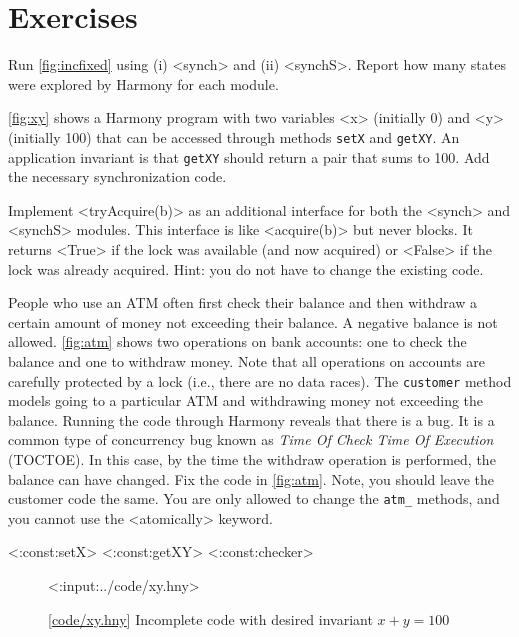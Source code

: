 \documentclass{report}
\newcommand{\harmonylink}[1]{%
[\href{https://harmony.cs.cornell.edu/#1}{\underline{#1}}]%
}
\newenvironment{code}{
\tcolorbox
}{
\endtcolorbox
}
\begin{document}
\section*{Exercises}
\begin{problems}
\item
Run \autoref{fig:incfixed} using (i) <{synch}> and (ii) <{synchS}>.
Report how many states were explored by Harmony for each module.
\item \label{ex:xy} \autoref{fig:xy} shows a Harmony program with two variables <{x}>
(initially 0) and <{y}> (initially 100) that can be accessed through methods
\texttt{setX} and \texttt{getXY}.  An application invariant is that \texttt{getXY}
should return a pair that sums to 100.  Add the necessary synchronization code.
\item \label{ex:trylock} Implement <{tryAcquire(b)}> as an additional
interface for both the <{synch}> and <{synchS}> modules.
This interface is like <{acquire(b)}> but never blocks.  It
returns <{True}> if the lock was available (and now acquired) or <{False}>
if the lock was already acquired.
Hint: you do not have to change the existing code.
\item People who use an ATM often first check their balance and then withdraw
a certain amount of money not exceeding their balance.  A negative balance
is not allowed.  \autoref{fig:atm} shows two operations on bank accounts:
one to check the balance and one to withdraw money.
Note that all operations on accounts are carefully protected by a lock
(i.e., there are no data races).
The \texttt{customer}
method models going to a particular ATM and withdrawing money not exceeding
the balance.
Running the code through Harmony reveals that there is a bug.
It is a common type of concurrency bug known as \emph{Time Of Check Time Of
Execution} (TOCTOE).
In this case, by the time the withdraw operation is performed,
the balance can have changed.
Fix the code in \autoref{fig:atm}.  Note, you should leave the
customer code the same. You are only allowed to change the
\texttt{atm\_} methods, and you cannot use the <{atomically}>
keyword.
\end{problems}

<{:const:setX}>
<{:const:getXY}>
<{:const:checker}>

\begin{figure}
\begin{code}
<{:input:../code/xy.hny}>
\end{code}
\caption{\harmonylink{code/xy.hny} Incomplete code with desired invariant $x + y = 100$}
\label{fig:xy}
\end{figure}
\end{document}
